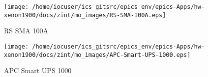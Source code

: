 \noindent
\vspace{1.4cm}
\begin{minipage}{.2\textwidth}
\begin{center}
\texttt{[image: /home/iocuser/ics\_gitsrc/epics\_env/epics-Apps/hw-xenon1900/docs/zint/mo\_images/RS-SMA-100A.eps]}
\end{center}
\end{minipage}
\begin{minipage}{.7\textwidth}
RS SMA 100A
\end{minipage}


\noindent
\vspace{1.4cm}
\begin{minipage}{.2\textwidth}
\begin{center}
\texttt{[image: /home/iocuser/ics\_gitsrc/epics\_env/epics-Apps/hw-xenon1900/docs/zint/mo\_images/APC-Smart-UPS-1000.eps]}
\end{center}
\end{minipage}
\begin{minipage}{.7\textwidth}
APC Smart UPS 1000
\end{minipage}



